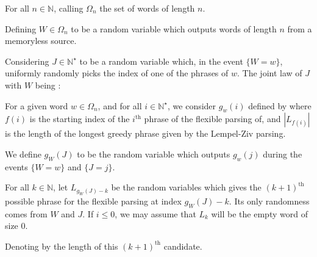 

\begin{df}
For all $n\in\mathbb{N}$, calling $\Omega_n$ the set 
of words of length $n$.
\end{df}

\begin{df}
Defining $W \in \Omega_n$ to be a random variable which outputs 
words of length $n$ from a memoryless source.
\end{df}

\begin{df}
Considering $J \in \mathbb{N}^{\star}$ to be a random
variable which, in the event $\{ W = w \}$,
uniformly randomly picks the index of
one of the phrases of $w$.
The joint law of $J$ with $W$ being :

\end{df}

\begin{df}
For a given word $w\in\Omega_n$, 
and for all $i\in\mathbb{N}^{\star}$, 
we consider $g_w(i)$ defined by
where $f(i)$ is the starting index
of the $i^{\text{th}}$ phrase of the flexible parsing of,
and $|L_{f(i)}|$ is the length of the longest greedy phrase
given by the Lempel-Ziv parsing.
\end{df}

\begin{df}
We define $g_W(J)$ to be the random variable which
outputs $g_w(j)$ during the events $\{ W=w \}$ and $\{ J = j \}$.
\end{df}

\begin{df}
For all $k \in \mathbb{N}$, let $L_{g_W(J) - k}$ be the random
variables which gives the $(k+1)^{\text{th}}$ possible phrase 
for the flexible parsing at index $g_W(J) - k$. 
Its only randomness comes from $W$ and $J$. 
If $i\leq 0$, we may assume that $L_k$ will be the empty word of 
size 0.
\end{df}


\begin{nota}
    Denoting by
    \noindent the length of this $(k+1)^{\text{th}}$ candidate.
\end{nota}


